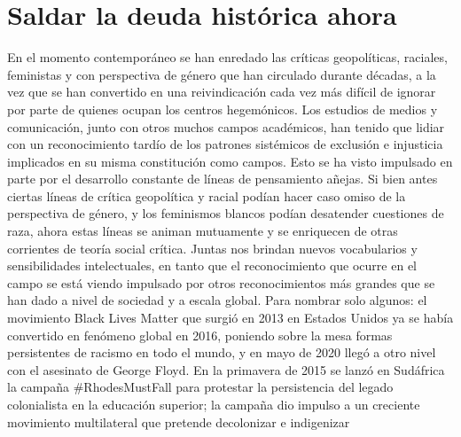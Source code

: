 \documentclass{tufte-handout}
\begin{document}
\hypertarget{saldar-la-deuda-histuxf3rica-ahora}{%
\section{Saldar la deuda histórica
ahora}\label{saldar-la-deuda-histuxf3rica-ahora}}

En el momento contemporáneo se han enredado las críticas geopolíticas,
raciales, feministas y con perspectiva de género que han circulado
durante décadas, a la vez que se han convertido en una reivindicación
cada vez más difícil de ignorar por parte de quienes ocupan los centros
hegemónicos. Los estudios de medios y comunicación, junto con otros
muchos campos académicos, han tenido que lidiar con un reconocimiento
tardío de los patrones sistémicos de exclusión e injusticia implicados
en su misma constitución como campos. Esto se ha visto impulsado en
parte por el desarrollo constante de líneas de pensamiento añejas. Si
bien antes ciertas líneas de crítica geopolítica y racial podían hacer
caso omiso de la perspectiva de género, y los feminismos blancos podían
desatender cuestiones de raza, ahora estas líneas se animan mutuamente y
se enriquecen de otras corrientes de teoría social crítica. Juntas nos
brindan nuevos vocabularios y sensibilidades intelectuales, en tanto que
el reconocimiento que ocurre en el campo se está viendo impulsado por
otros reconocimientos más grandes que se han dado a nivel de sociedad y
a escala global. Para nombrar solo algunos: el movimiento Black Lives
Matter que surgió en 2013 en Estados Unidos ya se había convertido en
fenómeno global en 2016, poniendo sobre la mesa formas persistentes de
racismo en todo el mundo, y en mayo de 2020 llegó a otro nivel con el
asesinato de George Floyd. En la primavera de 2015 se lanzó en Sudáfrica
la campaña \#RhodesMustFall para protestar la persistencia del legado
colonialista en la educación superior; la campaña dio impulso a un
creciente movimiento multilateral que pretende decolonizar e indigenizar
\end{document}
